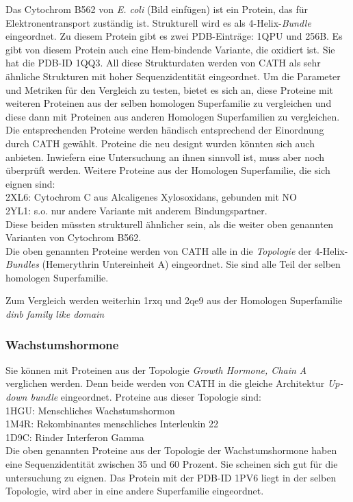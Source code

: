 \documentclass{report}
\begin{document}
Das Cytochrom B562 von \emph{E. coli} (Bild einf\"ugen) ist ein Protein, das f\"ur Elektronentransport zust\"andig ist. Strukturell wird es als 4-Helix-\textit{Bundle} eingeordnet. Zu diesem Protein gibt es zwei PDB-Eintr\"age: 1QPU und 256B. Es gibt von diesem Protein auch eine Hem-bindende Variante, die oxidiert ist. Sie hat die PDB-ID 1QQ3. All diese Strukturdaten werden von CATH als sehr \"ahnliche Strukturen mit hoher Sequenzidentit\"at eingeordnet.
Um die Parameter und Metriken f\"ur den Vergleich zu testen, bietet es sich an, diese Proteine mit weiteren Proteinen aus der selben homologen Superfamilie zu vergleichen und diese dann mit Proteinen aus anderen Homologen Superfamilien zu vergleichen. Die entsprechenden Proteine werden h\"andisch entsprechend der Einordnung durch CATH gew\"ahlt. Proteine die neu designt wurden k\"onnten sich auch anbieten. Inwiefern eine Untersuchung an ihnen sinnvoll ist, muss aber noch \"uberpr\"uft werden.
Weitere Proteine aus der Homologen Superfamilie, die sich eignen sind:\\
2XL6: Cytochrom C aus Alcaligenes Xylosoxidans, gebunden mit NO\\
2YL1: s.o. nur andere Variante mit anderem Bindungspartner.\\
Diese beiden m\"ussten strukturell \"ahnlicher sein, als die weiter oben genannten Varianten von Cytochrom B562.\\
Die oben genannten Proteine werden von CATH alle in die \emph{Topologie} der 4-Helix-\textit{Bundles} (Hemerythrin Untereinheit A) eingeordnet. Sie sind alle Teil der selben homologen Superfamilie.

Zum Vergleich werden weiterhin 1rxq und 2qe9 aus der Homologen Superfamilie \textit{dinb family like domain}  




\subsubsection{Wachstumshormone}

Sie k\"onnen mit Proteinen aus der Topologie \textit{Growth Hormone, Chain A} verglichen werden. Denn beide werden von CATH in die gleiche Architektur \emph{Up-down bundle} eingeordnet. Proteine aus dieser Topologie sind: \\
1HGU: Menschliches Wachstumshormon\\
1M4R: Rekombinantes menschliches Interleukin 22\\
1D9C: Rinder Interferon Gamma \\
Die oben genannten Proteine aus der Topologie der Wachstumshormone haben eine Sequenzidentit\"at zwischen 35 und 60 Prozent. Sie scheinen sich gut f\"ur die untersuchung zu eignen.
Das Protein mit der PDB-ID 1PV6 liegt in der selben Topologie, wird aber in eine andere Superfamilie eingeordnet.
\end{document}
